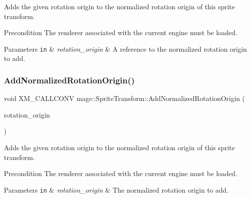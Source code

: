 Adds the given rotation origin to the normalized rotation origin of this sprite transform.

\begin{DoxyPrecond}{Precondition}
The renderer associated with the current engine must be loaded. 
\end{DoxyPrecond}

\begin{DoxyParams}[1]{Parameters}
\mbox{\tt in}  & {\em rotation\+\_\+origin} & A reference to the normalized rotation origin to add. \\
\hline
\end{DoxyParams}
\hypertarget{structmage_1_1_sprite_transform_a5571cc3e5700aba23f8c229675f10c3e}{}\label{structmage_1_1_sprite_transform_a5571cc3e5700aba23f8c229675f10c3e} 
\subsubsection{\texorpdfstring{Add\+Normalized\+Rotation\+Origin()}{AddNormalizedRotationOrigin()}\hspace{0.1cm}{\footnotesize\ttfamily [3/3]}}
{\footnotesize\ttfamily void X\+M\+\_\+\+C\+A\+L\+L\+C\+O\+NV mage\+::\+Sprite\+Transform\+::\+Add\+Normalized\+Rotation\+Origin (\begin{DoxyParamCaption}\item[{F\+X\+M\+V\+E\+C\+T\+OR}]{rotation\+\_\+origin }\end{DoxyParamCaption})}

Adds the given rotation origin to the normalized rotation origin of this sprite transform.

\begin{DoxyPrecond}{Precondition}
The renderer associated with the current engine must be loaded. 
\end{DoxyPrecond}

\begin{DoxyParams}[1]{Parameters}
\mbox{\tt in}  & {\em rotation\+\_\+origin} & The normalized rotation origin to add. \\
\hline
\end{DoxyParams}
\hypertarget{structmage_1_1_sprite_transform_aa505b54a1c081e91e1238d22487725bf}{}\label{structmage_1_1_sprite_transform_aa505b54a1c081e91e1238d22487725bf} 

